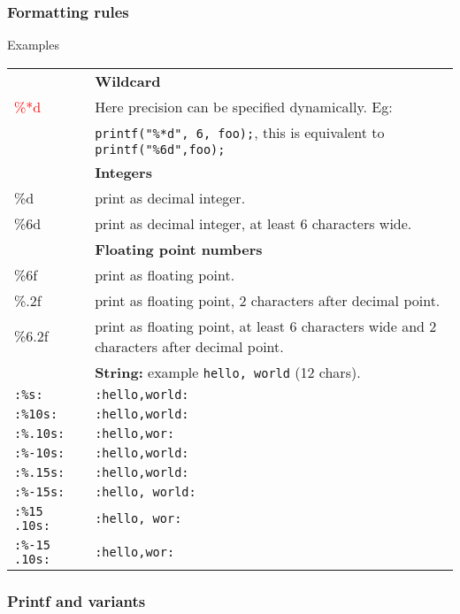 \subsubsection{Formatting rules}
Examples
\begin{tabularx}{\linewidth}{lX}
& \textbf{Wildcard}\\
\textcolor{red}{\%*d} & Here precision can be specified dynamically. Eg: \\
& \texttt{printf("\%*d", 6, foo);}, this is equivalent to \texttt{printf("\%6d",foo);}\\
& \textbf{Integers}\\
\%d & print as decimal integer.\\
\%6d & print as decimal integer, at least 6 characters wide.\\
& \textbf{Floating point numbers}\\
\%6f & print as floating point.\\
\%.2f & print as floating point, 2 characters after decimal point.\\
\%6.2f & print as floating point, at least 6 characters wide and 2 characters after decimal point.\\
& \textbf{String:} example \texttt{hello, world} (12 chars).\\
\texttt{:\%s:} & \texttt{:hello,\textvisiblespace world:}\\
\texttt{:\%10s:} & \texttt{:hello,\textvisiblespace world:}\\
\texttt{:\%.10s:} & \texttt{:hello,\textvisiblespace wor:}\\
\texttt{:\%-10s:} & \texttt{:hello,\textvisiblespace world:}\\
\texttt{:\%.15s:} & \texttt{:hello,\textvisiblespace world:}\\
\texttt{:\%-15s:} & \texttt{:hello, world\textvisiblespace\textvisiblespace\textvisiblespace:} \\
\texttt{:\%15 .10s:} & \texttt{:\textvisiblespace\textvisiblespace\textvisiblespace\textvisiblespace\textvisiblespace hello, wor:}\\
\texttt{:\%-15 .10s:} & \texttt{:hello,\textvisiblespace wor\textvisiblespace\textvisiblespace\textvisiblespace\textvisiblespace\textvisiblespace:}\\
\end{tabularx}

\subsubsection{Printf and variants}

